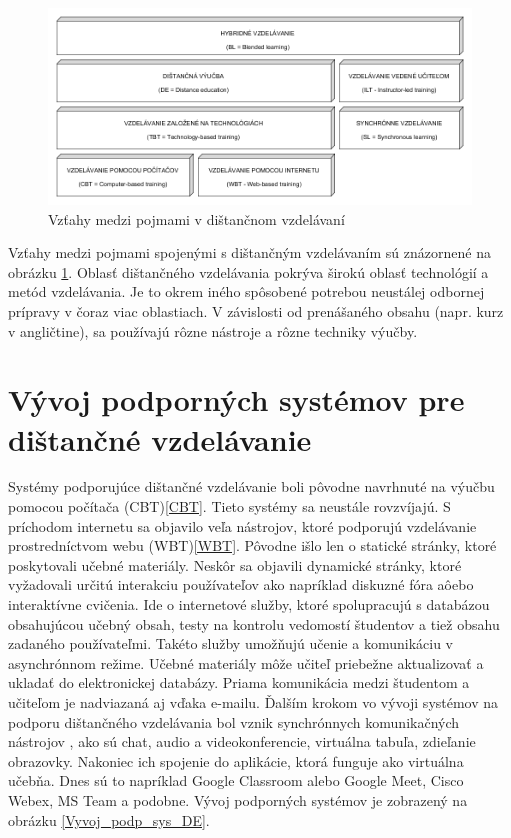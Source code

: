 \documentclass[10pt,oneside,slovak,a4paper]{article}
\begin{document}
\begin{figure}[h]
	\centering
	\includegraphics[width=\textwidth]{Vztahy_DE.png}
	\caption{Vzťahy medzi pojmami v dištančnom vzdelávaní\cite{WiktorzakKotowski}}
	\label{Vztahy_medzi_pojmami}
\end{figure}

Vzťahy medzi pojmami spojenými s dištančným vzdelávaním sú znázornené na obrázku \ref{Vztahy_medzi_pojmami}.
Oblasť dištančného vzdelávania pokrýva širokú oblasť technológií a metód vzdelávania. 
Je to okrem iného spôsobené potrebou neustálej odbornej prípravy v čoraz viac oblastiach.
V závislosti od prenášaného obsahu (napr. kurz v angličtine), sa používajú rôzne nástroje a rôzne techniky výučby.\cite{WiktorzakKotowski}

\section{Vývoj podporných systémov pre dištančné vzdelávanie}%
\label{Vyvojsys}
Systémy podporujúce dištančné vzdelávanie boli pôvodne navrhnuté na výučbu pomocou počítača (CBT)\ref{CBT}. Tieto systémy sa neustále rovzvíjajú.
S príchodom internetu sa objavilo veľa nástrojov, ktoré podporujú vzdelávanie prostredníctvom webu (WBT)\ref{WBT}.
Pôvodne išlo len o statické stránky, ktoré poskytovali učebné materiály. Neskôr sa objavili dynamické stránky, ktoré vyžadovali určitú interakciu používateľov ako napríklad diskuzné fóra aôebo interaktívne cvičenia.
Ide o internetové služby, ktoré spolupracujú s databázou obsahujúcou učebný obsah, testy na kontrolu vedomostí študentov a tiež obsahu zadaného používateľmi.
Takéto služby umožňujú učenie a komunikáciu v asynchrónnom režime. %
Učebné materiály môže učiteľ priebežne aktualizovať a ukladať do elektronickej databázy.
Priama komunikácia medzi študentom a učiteľom je nadviazaná aj vďaka e-mailu.
Ďalším krokom vo vývoji systémov na podporu dištančného vzdelávania bol vznik synchrónnych komunikačných nástrojov
, ako sú chat, audio a videokonferencie, virtuálna tabuľa, zdieľanie obrazovky. Nakoniec ich spojenie do aplikácie, ktorá funguje ako virtuálna učebňa.\cite{WiktorzakKotowski} 
Dnes sú to napríklad Google Classroom alebo Google Meet, Cisco Webex, MS Team a podobne.
Vývoj podporných systémov je zobrazený na obrázku \ref{Vyvoj_podp_sys_DE}.
\end{document}
